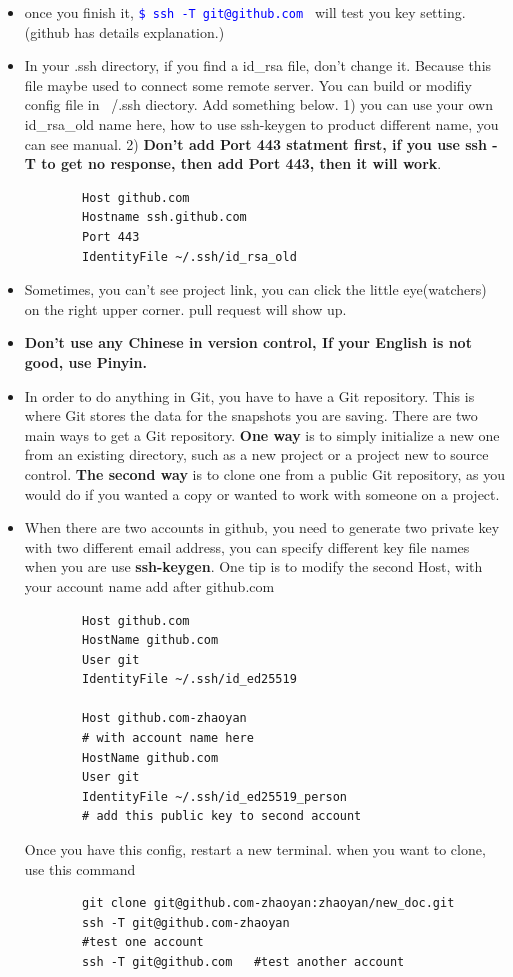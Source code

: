 \documentclass[a4paper,11pt,twoside]{book}
\newcommand{\linuxcommand}[1]{\texttt{\textcolor{blue}{\$ #1 \Pisymbol{psy}{191}}}}
\begin{document}
\begin{itemize}
	
	\item once you finish it, \linuxcommand{ssh -T git@github.com} will test you key setting. (github has details explanation.)
	
	\item In your .ssh directory, if you find a id\_rsa file, don't change it. Because this file maybe used to connect some remote server. You can build or modifiy config file in ~/.ssh diectory. Add something below. 1) you can use your own id\_rsa\_old name here, how to use ssh-keygen to product different name, you can see manual. 2) \textbf{Don't add Port 443 statment first, if you use ssh -T to get no response, then add Port 443, then it will work}.
	\begin{verbatim}
		Host github.com
		Hostname ssh.github.com
		Port 443
		IdentityFile ~/.ssh/id_rsa_old
	\end{verbatim}
	
	\item Sometimes, you can't see project link, you can click the little eye(watchers) on the right upper corner. pull request will show up.
	
	\item \textbf{Don't use any Chinese in version control, If your English is not good, use Pinyin.}
	
	\item In order to do anything in Git, you have to have a Git repository. This is where Git stores the data for the snapshots you are saving. There are two main ways to get a Git repository. \textbf{One way} is to simply initialize a new one from an existing directory, such as a new project or a project new to source control. \textbf{The second way} is to clone one from a public Git repository, as you would do if you wanted a copy or wanted to work with someone on a project.
	
	\item When there are two accounts in github, you need to generate two private key with two different email address, you can specify different key file names when you are use \textbf{ssh-keygen}. One tip is to modify the second Host, with your account name add after github.com
	\begin{verbatim}
		Host github.com
		HostName github.com
		User git
		IdentityFile ~/.ssh/id_ed25519
		
		Host github.com-zhaoyan
		# with account name here
		HostName github.com
		User git
		IdentityFile ~/.ssh/id_ed25519_person 
		# add this public key to second account
	\end{verbatim}
	Once you have this config, restart a new terminal. when you want to clone, use this command
	\begin{verbatim}
		git clone git@github.com-zhaoyan:zhaoyan/new_doc.git
		ssh -T git@github.com-zhaoyan
		#test one account
		ssh -T git@github.com   #test another account
	\end{verbatim}
	
	
	
\end{itemize}
\end{document}
